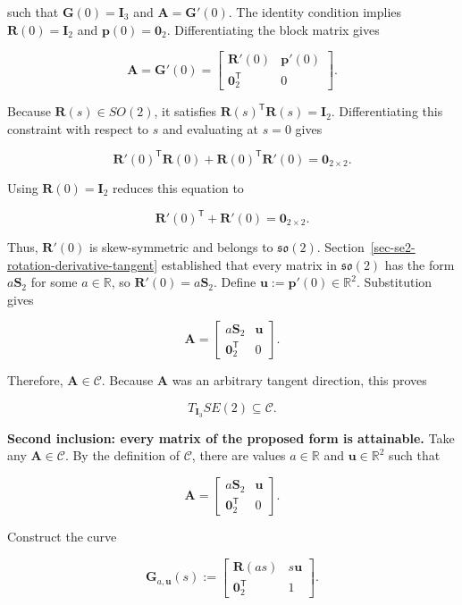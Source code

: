 \documentclass[
  australian,
  12pt,
  letterpaper,
  DIV=11,
  numbers=noendperiod,
  twoside]{scrreprt}
\begin{document}
such that \(\mathbf G(0)=\mathbf I_3\) and \(\mathbf A=\mathbf G'(0)\).
The identity condition implies \(\mathbf R(0)=\mathbf I_2\) and
\(\mathbf p(0)=\mathbf 0_2\). Differentiating the block matrix gives

\[
\mathbf A
=
\mathbf G'(0)
=
\begin{bmatrix}
\mathbf R'(0)&\mathbf p'(0)\\
\mathbf 0_2^\mathsf T&0
\end{bmatrix}.
\]

Because \(\mathbf R(s)\in SO(2)\), it satisfies
\(\mathbf R(s)^\mathsf T\mathbf R(s)=\mathbf I_2\). Differentiating this
constraint with respect to \(s\) and evaluating at \(s=0\) gives

\[
\mathbf R'(0)^\mathsf T\mathbf R(0)
+
\mathbf R(0)^\mathsf T\mathbf R'(0)
=
\mathbf 0_{2\times2}.
\]

Using \(\mathbf R(0)=\mathbf I_2\) reduces this equation to

\[
\mathbf R'(0)^\mathsf T
+
\mathbf R'(0)
=
\mathbf 0_{2\times2}.
\]

Thus, \(\mathbf R'(0)\) is skew-symmetric and belongs to
\(\mathfrak{so}(2)\). Section~\ref{sec-se2-rotation-derivative-tangent}
established that every matrix in \(\mathfrak{so}(2)\) has the form
\(a\mathbf S_2\) for some \(a\in\mathbb R\), so
\(\mathbf R'(0)=a\mathbf S_2\). Define
\(\mathbf u\mathrel{:=}\mathbf p'(0)\in\mathbb R^2\). Substitution gives

\[
\mathbf A
=
\begin{bmatrix}
a\mathbf S_2&\mathbf u\\
\mathbf 0_2^\mathsf T&0
\end{bmatrix}.
\]

Therefore, \(\mathbf A\in\mathcal C\). Because \(\mathbf A\) was an
arbitrary tangent direction, this proves

\[
T_{\mathbf I_3}SE(2)
\subseteq
\mathcal C.
\]

\textbf{Second inclusion: every matrix of the proposed form is
attainable.} Take any \(\mathbf A\in\mathcal C\). By the definition of
\(\mathcal C\), there are values \(a\in\mathbb R\) and
\(\mathbf u\in\mathbb R^2\) such that

\[
\mathbf A
=
\begin{bmatrix}
a\mathbf S_2&\mathbf u\\
\mathbf 0_2^\mathsf T&0
\end{bmatrix}.
\]

Construct the curve

\[
\mathbf G_{a,\mathbf u}(s)
\mathrel{:=}
\begin{bmatrix}
\mathbf R(as)&s\mathbf u\\
\mathbf 0_2^\mathsf T&1
\end{bmatrix}.
\]
\end{document}
